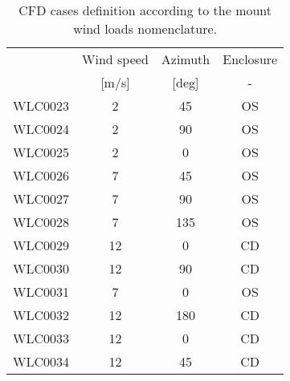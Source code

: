 \begin{table}
  \centering
  \begin{tabular}{cccc}\toprule
    & Wind speed & Azimuth & Enclosure\\
    & [m/s]       & [deg]   & - \\\midrule
    WLC0023 &  2  &  45     & OS \\
    WLC0024 &  2  &  90     & OS \\
    WLC0025 &  2  &   0     & OS \\
    WLC0026 &  7  &  45     & OS \\
    WLC0027 &  7  &  90     & OS \\
    WLC0028 &  7  & 135     & OS \\
    WLC0029 & 12  &   0     & CD \\
    WLC0030 & 12  &  90     & CD \\
    WLC0031 &  7  &   0     & OS \\
    WLC0032 & 12  & 180     & CD \\
    WLC0033 & 12  &   0     & CD \\
    WLC0034 & 12  &  45     & CD \\
    \bottomrule
  \end{tabular}
  \caption{CFD cases definition according to the mount wind loads nomenclature.}
  \label{tab:mount-cases}
\end{table}




 
